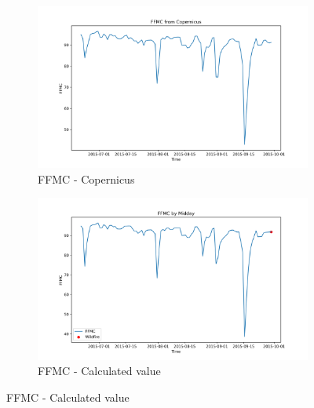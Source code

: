 \begin{figure}[h]
\caption{Comparison of FFMC calculated values and Copernicus}
    \centering
    \begin{subfigure}{0.49\textwidth}
        \centering
        \includegraphics[width=\textwidth]{graphs/2015MesmoSitio/2015CopernicusFFMC12.png}
        \caption{FFMC - Copernicus}
        \label{fig:ffmc_copernicus_2015_semfogo}
    \end{subfigure}
    \hfill
    \begin{subfigure}{0.49\textwidth}
        \centering
        \includegraphics[width=\textwidth]{graphs/2015MesmoSitio/2015CalcFFMC12.png}
        \caption{FFMC - Calculated value}
        \label{fig:ffmc_calculated_2015_semfogo}
    \end{subfigure}
    \label{fig:comparison_ffmc_semfogo_copernicus_calculated}
\end{figure}

